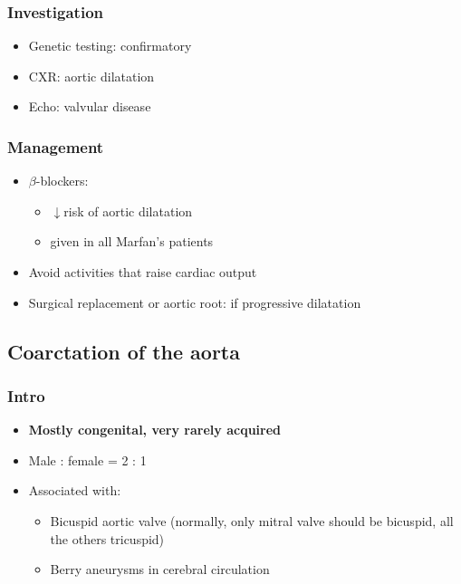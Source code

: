 \documentclass[
  12pt,
]{memoir}
\providecommand{\tightlist}{%
  \setlength{\itemsep}{0pt}\setlength{\parskip}{0pt}}
\begin{document}
\hypertarget{investigation-6}{%
\subsubsection{Investigation}\label{investigation-6}}

\begin{itemize}
\tightlist
\item
  Genetic testing: confirmatory
\item
  CXR: aortic dilatation
\item
  Echo: valvular disease
\end{itemize}

\hypertarget{management-8}{%
\subsubsection{Management}\label{management-8}}

\begin{itemize}
\tightlist
\item
  \(\beta\)-blockers:

  \begin{itemize}
  \tightlist
  \item
    \(\downarrow\)risk of aortic dilatation
  \item
    given in all Marfan's patients
  \end{itemize}
\item
  Avoid activities that raise cardiac output
\item
  Surgical replacement or aortic root: if progressive dilatation
\end{itemize}

\hypertarget{coarctation-of-the-aorta}{%
\subsection{Coarctation of the aorta}\label{coarctation-of-the-aorta}}

\label{ssec:coarc}

\hypertarget{intro-7}{%
\subsubsection{Intro}\label{intro-7}}

\begin{itemize}
\tightlist
\item
  \textbf{Mostly congenital, very rarely acquired}
\item
  Male : female = 2 : 1
\item
  Associated with:

  \begin{itemize}
  \tightlist
  \item
    Bicuspid aortic valve (normally, only mitral valve should be
    bicuspid, all the others tricuspid)
  \item
    Berry aneurysms in cerebral circulation
  \end{itemize}
\end{itemize}
\end{document}
